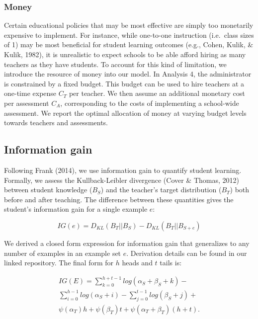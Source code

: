 \documentclass[10pt, letterpaper]{article}
\begin{document}
\subsubsection{Money}\label{money}

Certain educational policies that may be most effective are simply too
monetarily expensive to implement. For instance, while one-to-one
instruction (i.e.~class sizes of 1) may be most beneficial for student
learning outcomes (e.g., Cohen, Kulik, \& Kulik, 1982), it is
unrealistic to expect schools to be able afford hiring as many teachers
as they have students. To account for this kind of limitation, we
introduce the resource of money into our model. In Analysis 4, the
administrator is constrained by a fixed budget. This budget can be used
to hire teachers at a one-time expense \(C_T\) per teacher. We then
assume an additional monetary cost per assessment \(C_A\), corresponding
to the costs of implementing a school-wide assessment. We report the
optimal allocation of money at varying budget levels towards teachers
and assessments.

\subsection{Information gain}\label{information-gain}

Following Frank (2014), we use information gain to quantify student
learning. Formally, we assess the Kullback-Leibler divergence (Cover \&
Thomas, 2012) between student knowledge (\(B_S\)) and the teacher's
target distribution (\(B_T\)) both before and after teaching. The
difference between these quantities gives the student's information gain
for a single example \(e\):

\[IG(e) = D_{KL}(B_T ||B_S) - D_{KL}(B_T || B_{S+e})\]

We derived a closed form expression for information gain that
generalizes to any number of examples in an example set \(e\).
Derivation details can be found in our linked repository. The final form
for \(h\) heads and \(t\) tails is:

\begin{multline}
IG(E) = \sum_{k=0}^{h+t-1} {log(\alpha_S + \beta_S + k)} - \\
\sum_{i=0}^{h-1} {log (\alpha_S + i)} - \sum_{j=0}^{t-1} {log(\beta_S +j)} + \\
\psi(\alpha_T)h + \psi(\beta_T)t +  \psi(\alpha_T + \beta_T)(h+t).
\end{multline}
\end{document}
